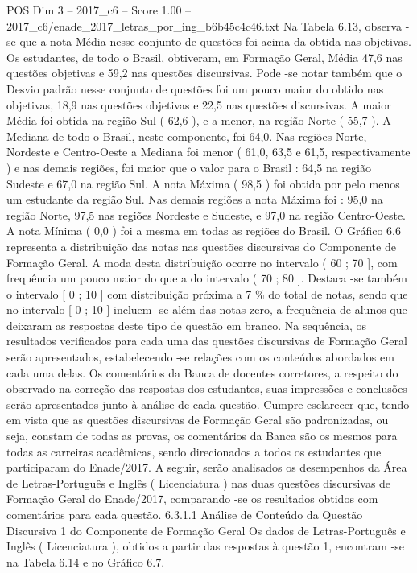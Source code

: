 \begin{textsample}{POS Dim 3 – 2017\_c6 – Score 1.00 – 2017\_c6/enade\_2017\_letras\_por\_ing\_b6b45c4c46.txt}
Na Tabela 6.13, observa -se que a nota Média nesse conjunto de questões foi acima da obtida nas objetivas.
Os estudantes, de todo o Brasil, obtiveram, em Formação Geral, Média 47,6 nas questões objetivas e 59,2 nas questões discursivas.
Pode -se notar também que o Desvio padrão nesse conjunto de questões foi um pouco maior do obtido nas objetivas, 18,9 nas questões objetivas e 22,5 nas questões discursivas.
A maior Média foi obtida na região Sul ( 62,6 ), e a menor, na região Norte ( 55,7 ).
A Mediana de todo o Brasil, neste componente, foi 64,0.
Nas regiões Norte, Nordeste e Centro-Oeste a Mediana foi menor ( 61,0, 63,5 e 61,5, respectivamente ) e nas demais regiões, foi maior que o valor para o Brasil : 64,5 na região Sudeste e 67,0 na região Sul.
A nota Máxima ( 98,5 ) foi obtida por pelo menos um estudante da região Sul.
Nas demais regiões a nota Máxima foi : 95,0 na região Norte, 97,5 nas regiões Nordeste e Sudeste, e 97,0 na região Centro-Oeste.
A nota Mínima ( 0,0 ) foi a mesma em todas as regiões do Brasil.
O Gráfico 6.6 representa a distribuição das notas nas questões discursivas do Componente de Formação Geral.
A moda desta distribuição ocorre no intervalo ( 60 ; 70 ], com frequência um pouco maior do que a do intervalo ( 70 ; 80 ].
Destaca -se também o intervalo [ 0 ; 10 ] com distribuição próxima a 7 \% do total de notas, sendo que no intervalo [ 0 ; 10 ] incluem -se além das notas zero, a frequência de alunos que deixaram as respostas deste tipo de questão em branco.
Na sequência, os resultados verificados para cada uma das questões discursivas de Formação Geral serão apresentados, estabelecendo -se relações com os conteúdos abordados em cada uma delas.
Os comentários da Banca de docentes corretores, a respeito do observado na correção das respostas dos estudantes, suas impressões e conclusões serão apresentados junto à análise de cada questão.
Cumpre esclarecer que, tendo em vista que as questões discursivas de Formação Geral são padronizadas, ou seja, constam de todas as provas, os comentários da Banca são os mesmos para todas as carreiras acadêmicas, sendo direcionados a todos os estudantes que participaram do Enade/2017.
A seguir, serão analisados os desempenhos da Área de Letras-Português e Inglês ( Licenciatura ) nas duas questões discursivas de Formação Geral do Enade/2017, comparando -se os resultados obtidos com comentários para cada questão. 6.3.1.1 Análise de Conteúdo da Questão Discursiva 1 do Componente de Formação Geral Os dados de Letras-Português e Inglês ( Licenciatura ), obtidos a partir das respostas à questão 1, encontram -se na Tabela 6.14 e no Gráfico 6.7.

\end{textsample}
